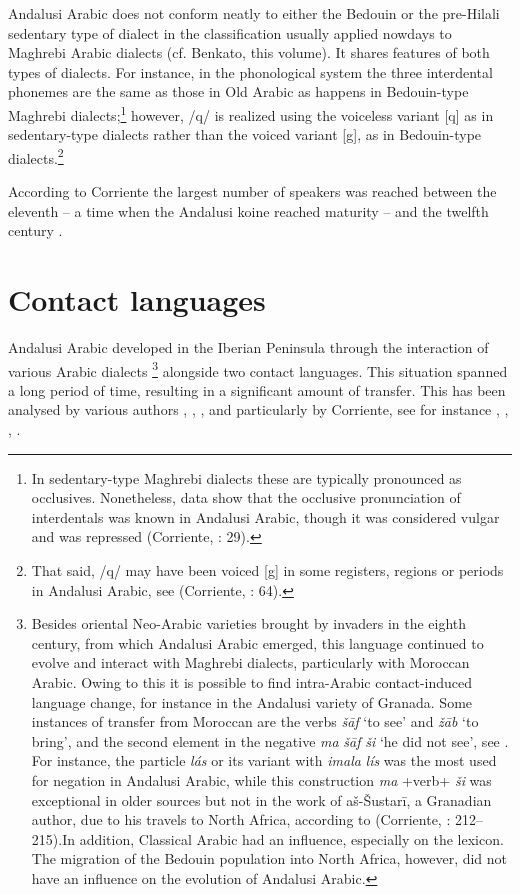 \documentclass[output=paper,modfonts,nonflat]{langsci/langscibook}
\begin{document}
Andalusi Arabic does not conform neatly to either the Bedouin or the pre-Hilali sedentary type of dialect in the classification usually applied nowdays to Maghrebi Arabic dialects (cf. Benkato, this volume). It shares features of both types of dialects. For instance, in the phonological system the three interdental phonemes are the same as those in Old Arabic as happens in Bedouin-type Maghrebi dialects;\footnote{In sedentary-type Maghrebi dialects these are typically pronounced as occlusives. Nonetheless, data show that the occlusive pronunciation of interdentals was known in Andalusi Arabic, though it was considered vulgar and was repressed (Corriente, \citealt{PereiraVicente2015}: 29).}  however, /q/ is realized using the voiceless variant [q] as in sedentary-type dialects rather than the voiced variant [g], as in Bedouin-type dialects.\footnote{That said, /q/ may have been voiced [g] in some registers, regions or periods in Andalusi Arabic, see (Corriente, \citealt{PereiraVicente2015}: 64).}

According to Corriente the largest number of speakers was reached between the eleventh – a time when the Andalusi koine reached maturity – and the twelfth century \citep[34]{Corriente1992}. 


\section{Contact languages}


Andalusi Arabic developed in the Iberian Peninsula through the interaction of various Arabic dialects \footnote{Besides oriental Neo-Arabic varieties brought by invaders in the eighth century, from which Andalusi Arabic emerged, this language continued to evolve and interact with Maghrebi dialects, particularly with Moroccan Arabic. Owing to this it is possible to find intra-Arabic contact-induced language change, for instance in the Andalusi variety of Granada. Some instances of transfer from Moroccan are the verbs \textit{šāf} ‘to see’ and \textit{žāb} ‘to bring’, and the second element in the negative \textit{ma} \textit{šāf} \textit{ši} ‘he did not see’, see \citep[57]{Corriente1998a}. For instance, the particle \textit{lás} or its variant with \textit{imala} \textit{lís} was the most used for negation in Andalusi Arabic, while this construction \textit{ma} +verb+ \textit{ši} was exceptional {in older sources but not in the work of a}š-Šustarī, a Granadian{ author, due to his travels to North Africa, according to} (Corriente, \citealt{PereiraVicente2015}: 212–215){.}In addition, Classical Arabic had an influence, especially on the lexicon. The migration of the Bedouin population into North Africa, however, did not have an influence on the evolution of Andalusi Arabic.} alongside two contact languages. This situation spanned a long period of time, resulting in a significant amount of transfer. This has been analysed by various authors \citep{Ferrando1995}, \citep{Ferrando1997}, \citep{Vicente2006}, and particularly by Corriente, see for instance \citep{Corriente1981}, \citep{Corriente1992}, \citep{Corriente2000}, \citep{Corriente2002}. 
\end{document}
